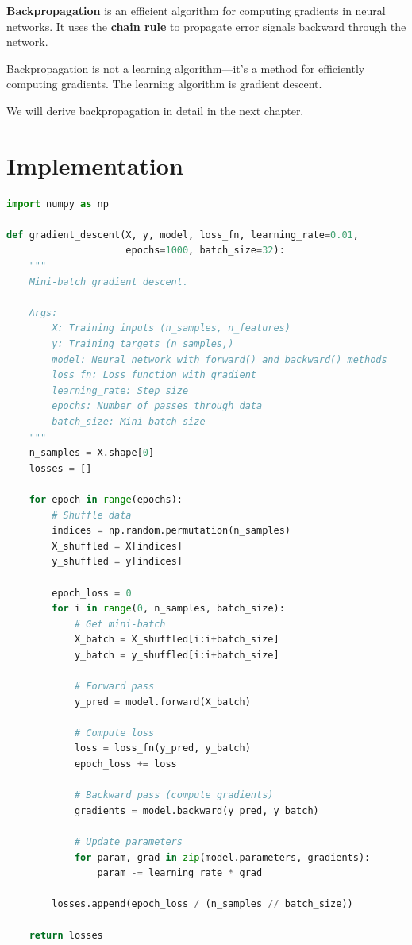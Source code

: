 \textbf{Backpropagation} is an efficient algorithm for computing gradients in neural networks. It uses the \textbf{chain rule} to propagate error signals backward through the network.

\begin{importantbox}
Backpropagation is not a learning algorithm---it's a method for efficiently computing gradients. The learning algorithm is gradient descent.
\end{importantbox}

We will derive backpropagation in detail in the next chapter.


\section{Implementation}

\begin{lstlisting}[language=Python, caption=Gradient Descent Implementation]
import numpy as np

def gradient_descent(X, y, model, loss_fn, learning_rate=0.01, 
                     epochs=1000, batch_size=32):
    """
    Mini-batch gradient descent.
    
    Args:
        X: Training inputs (n_samples, n_features)
        y: Training targets (n_samples,)
        model: Neural network with forward() and backward() methods
        loss_fn: Loss function with gradient
        learning_rate: Step size
        epochs: Number of passes through data
        batch_size: Mini-batch size
    """
    n_samples = X.shape[0]
    losses = []
    
    for epoch in range(epochs):
        # Shuffle data
        indices = np.random.permutation(n_samples)
        X_shuffled = X[indices]
        y_shuffled = y[indices]
        
        epoch_loss = 0
        for i in range(0, n_samples, batch_size):
            # Get mini-batch
            X_batch = X_shuffled[i:i+batch_size]
            y_batch = y_shuffled[i:i+batch_size]
            
            # Forward pass
            y_pred = model.forward(X_batch)
            
            # Compute loss
            loss = loss_fn(y_pred, y_batch)
            epoch_loss += loss
            
            # Backward pass (compute gradients)
            gradients = model.backward(y_pred, y_batch)
            
            # Update parameters
            for param, grad in zip(model.parameters, gradients):
                param -= learning_rate * grad
        
        losses.append(epoch_loss / (n_samples // batch_size))
    
    return losses
\end{lstlisting}

